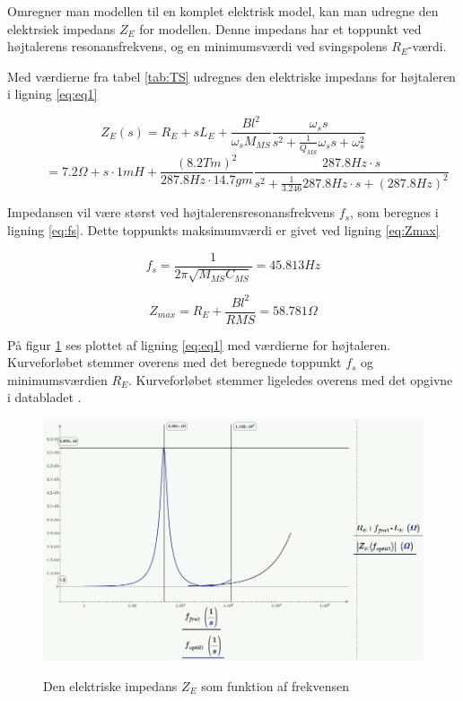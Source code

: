 Omregner man modellen til en komplet elektrisk model, kan man udregne den elektrsiek impedans $Z_E$ for modellen. Denne impedans har et toppunkt ved højtalerens resonansfrekvens, og en minimumsværdi ved svingspolens $R_E$-værdi.

Med værdierne fra tabel \ref{tab:TS} udregnes den elektriske impedans for højtaleren i ligning \ref{eq:eq1}

\begin{equation}\label{eq:eq1}
Z_E(s)=R_E+sL_E+\frac{Bl^2}{\omega_s M_{MS}} \frac{ \omega_s s}{ s^2 + \frac{1}{Q_{MS}} \omega_s s + \omega_s^2} \end{equation} \begin{equation} \ \qquad  = 
7.2\Omega + s \cdot 1mH + \frac{(8.2 Tm)^2}{287.8Hz \cdot 14.7gm} \frac{ 287.8Hz \cdot s}{ s^2 + \frac{1}{3.246} 287.8Hz \cdot s + (287.8Hz)^2}  \end{equation}

Impedansen vil være størst ved højtalerensresonansfrekvens $f_s$, som beregnes i ligning \ref{eq:fs}. Dette toppunkts maksimumværdi er givet ved ligning \ref{eq:Zmax} 

\begin{equation}\label{eq:fs}
f_s=\frac{1}{2 \pi \sqrt{M_{MS} C_{MS}}}=45.813Hz
\end{equation}

\begin{equation}\label{eq:Zmax}
Z_{max}=R_E+\frac{Bl^2}{R{MS}}=58.781\Omega
\end{equation}

På figur \ref{fig:ZE_graf}  ses plottet af ligning \ref{eq:eq1} med værdierne for højtaleren. Kurveforløbet stemmer overens med det beregnede toppunkt $f_s$ og minimumsværdien $R_E$. Kurveforløbet stemmer ligeledes overens med det opgivne i databladet \citep{FW168}.

\begin{figure}[H]
	\centering
	\includegraphics[width=\textwidth]{Pics/ZE_graf.PNG}
	\label{fig:ZE_graf}
	\caption{Den elektriske impedans $Z_E$ som funktion af frekvensen} 
\end{figure}

